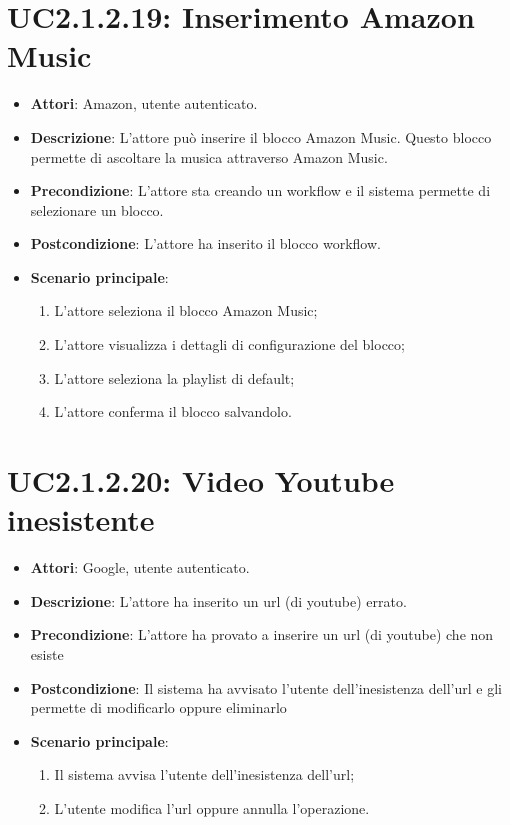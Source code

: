 \section{UC2.1.2.19: Inserimento Amazon Music}
\label{UC2.1.2.19}
\begin{itemize}
	\item \textbf{Attori}: Amazon, utente autenticato.
	\item \textbf{Descrizione}: L'attore può inserire il blocco Amazon Music. Questo blocco permette di ascoltare la musica attraverso Amazon Music.
	\item \textbf{Precondizione}: L'attore sta creando un workflow e il sistema permette di selezionare un blocco.	
	\item \textbf{Postcondizione}: L'attore ha inserito il blocco workflow.
	\item \textbf{Scenario principale}:
	\begin{enumerate} \item L'attore seleziona il blocco Amazon Music; \item L'attore visualizza i dettagli di configurazione del blocco;  \item  L'attore seleziona la playlist di default; \item L'attore conferma il blocco salvandolo.\end{enumerate}
\end{itemize}

\section{UC2.1.2.20: Video Youtube inesistente}
\label{UC2.1.2.20}
\begin{itemize}
	\item \textbf{Attori}: Google, utente autenticato.
	\item \textbf{Descrizione}: L'attore ha inserito un url (di youtube) errato.
	\item \textbf{Precondizione}: L'attore ha provato a inserire un url (di youtube) che non esiste
	\item \textbf{Postcondizione}: Il sistema ha avvisato l'utente dell'inesistenza dell'url e gli permette di modificarlo oppure eliminarlo
	\item \textbf{Scenario principale}:
	\begin{enumerate}  \item  Il sistema avvisa l'utente dell'inesistenza dell'url;  \item  L'utente modifica l'url oppure annulla l'operazione.\end{enumerate}
\end{itemize}

